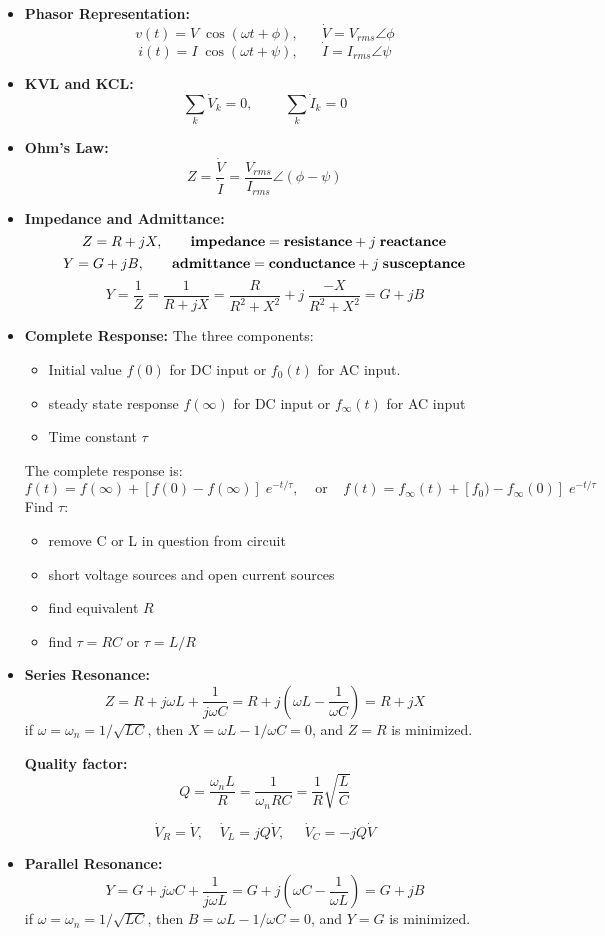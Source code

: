 \begin{itemize}
\item {\bf Phasor Representation:}
\[	v(t)=V\;\cos(\omega t +\phi),\;\;\;\;\;\; \dot{V}=V_{rms}\angle{\phi} \]
\[	i(t)=I\;\cos(\omega t +\psi),\;\;\;\;\;\; \dot{I}=I_{rms}\angle{\psi} \]
\item {\bf KVL and KCL:}
\[	\sum_k \dot{V}_k=0,\;\;\;\;\;\;\;\;\sum_k \dot{I}_k=0	\]
\item {\bf Ohm's Law:}
\[	Z=\frac{\dot{V}}{\dot{I}}=\frac{V_{rms}}{I_{rms}}\angle{(\phi-\psi)} \]
\item {\bf Impedance and Admittance:}
\[	Z=R+jX,\;\;\;\;\;\;\;
\mbox{{\bf impedance}}=\mbox{{\bf resistance}}+j\;\mbox{{\bf reactance}} \]
\[	Y=G+jB,\;\;\;\;\;\;\;
\mbox{{\bf admittance}}=\mbox{{\bf conductance}}+j\;\mbox{{\bf susceptance}} \]
\[ Y=\frac{1}{Z}=\frac{1}{R+jX}=\frac{R}{R^2+X^2}+j\;\frac{-X}{R^2+X^2}=G+jB \]
\item {\bf Complete Response:} The three components:
	\begin{itemize}
	\item Initial value $f(0)$ for DC input or $f_0(t)$ for AC input.
	\item steady state response $f(\infty)$ for DC input or $f_\infty(t)$ for 
	  AC input
	\item Time constant $\tau$ 
	\end{itemize}
	The complete response is:
\[ f(t)=f(\infty)+[f(0)-f(\infty)]\;e^{-t/\tau},\;\;\;\;\mbox{or}
	\;\;\;\;f(t)=f_\infty(t)+[f_0)-f_\infty(0)]\;e^{-t/\tau}	\]
	Find $\tau$:
	\begin{itemize}
	\item remove C or L in question from circuit
	\item short voltage sources and open current sources
	\item find equivalent $R$
	\item find $\tau=RC$ or $\tau=L/R$
	\end{itemize}
\item {\bf Series Resonance:}
\[	Z=R+j\omega L+\frac{1}{j\omega C}=R+j(\omega L-\frac{1}{\omega C})
	=R+jX	 \]
	if $\omega=\omega_n=1/\sqrt{LC}$, then $X=\omega L-1/\omega C=0$, 
	and $Z=R$ is minimized.

	{\bf Quality factor:} 
\[	Q=\frac{\omega_n L}{R}=\frac{1}{\omega_n RC}=\frac{1}{R}\sqrt{\frac{L}{C}} \]

\[	\dot{V}_R=\dot{V},\;\;\;\;\dot{V}_L=jQ\dot{V},\;\;\;\;\;\dot{V}_C=-jQ\dot{V} \]

\item {\bf Parallel Resonance:}
\[	Y=G+j\omega C+\frac{1}{j\omega L}=G+j\left(\omega C-\frac{1}{\omega L}\right)
	=G+jB	 \]
	if $\omega=\omega_n=1/\sqrt{LC}$, then $B=\omega L-1/\omega C=0$, 
	and $Y=G$ is minimized.


\end{itemize}
